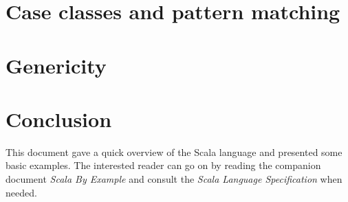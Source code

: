 \documentclass[a4paper,12pt]{article}
\newcommand{\langname}[1]{#1\xspace}
\newcommand{\Scala}{\langname{Scala}}
\begin{document}
\section{Case classes and pattern matching}
\label{sec:case-classes-pattern}


\section{Genericity}
\label{sec:genericity}



\section{Conclusion}
\label{sec:conclusion}

This document gave a quick overview of the \Scala language and
presented some basic examples. The interested reader can go on by
reading the companion document \textit{Scala By Example\/} and consult
the \textit{Scala Language Specification\/} when needed.
\end{document}
